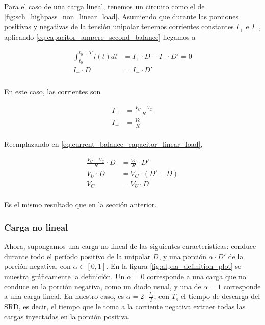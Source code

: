 Para el caso de una carga lineal, tenemos un circuito como el de
\ref{fig:sch_highpass_non_linear_load}. Asumiendo que durante las porciones
positivas y negativas de la tensión unipolar tenemos corrientes constantes $I_+$
e $I_-$, aplicando \ref{eq:capacitor_ampere_second_balance} llegamos a 

\begin{equation}
    \label{eq:current_balance_capacitor_linear_load}
    \begin{aligned}
        \int_{t_0}^{t_0+T} i(t)dt &= I_+ \cdot D - I_- \cdot D' = 0 \\
        I_+ \cdot D &= I_- \cdot D' \\
    \end{aligned}
\end{equation}

En este caso, las corrientes son

\begin{equation}
    \label{eq:highpass_currents_linear_load}
    \begin{aligned}
        I_+ &= \frac{V_U-V_C}{R} \\
        I_- &= \frac{Vc}{R} \\
    \end{aligned}
\end{equation}

Reemplazando en \ref{eq:current_balance_capacitor_linear_load},

\begin{equation}
    \label{eq:vc_linear_load}
    \begin{aligned}
        \frac{V_U-V_C}{R} \cdot D &= \frac{Vc}{R} \cdot D' \\
        V_U \cdot D &= V_C \cdot \left( D'+D \right) \\
        V_C &= V_U \cdot D \\
    \end{aligned}
\end{equation}

Es el mismo resultado que en la sección anterior.

\subsubsection{Carga no lineal}

Ahora, supongamos una carga no lineal de las siguientes características: conduce
durante todo el período positivo de la unipolar $D$, y una porción $\alpha \cdot
D'$ de la porción negativa, con $\alpha \in \left[0, 1 \right]$. En la figura
\ref{fig:alpha_definition_plot} se muestra gráficamente la definición. Un
$\alpha=0$ corresponde a una carga que no conduce en la porción negativa, como
un diodo usual, y una de $\alpha=1$ corresponde a una carga lineal. En nuestro
caso, es $\alpha = 2 \cdot \frac{T_s}{T}$, con $T_s$ el tiempo de descarga del
SRD, es decir, el tiempo que le toma  a la corriente negativa extraer todas las
cargas inyectadas en la porción positiva.

